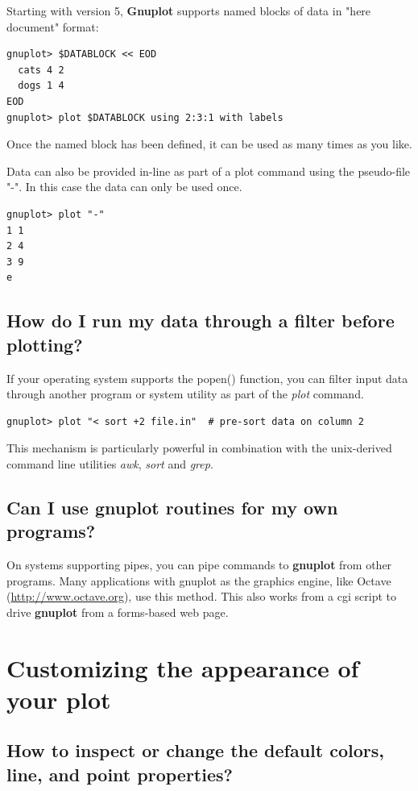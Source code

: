 \documentclass[letter,11pt]{article}
\def\http#1{{\small\href{http://#1}{\url{http://#1}}}}
\newcommand{\http}[1]%
            {\htmladdnormallink{\latex{\url{http://#1}}%
                    \html{\textit{http://#1}}}%
                {http://#1}%
            }
\newcommand{\gnuplot}{\textbf{gnuplot }}
\newcommand{\Gnuplot}{\textbf{Gnuplot }}
\begin{document}
{Starting with version 5, \Gnuplot supports named blocks of data in "here document" format:
\small
\begin{verbatim}
gnuplot> $DATABLOCK << EOD
  cats 4 2
  dogs 1 4
EOD
gnuplot> plot $DATABLOCK using 2:3:1 with labels
\end{verbatim}
\normalsize
Once the named block has been defined, it can be used as many times
as you like.

Data can also be provided in-line as part of a plot command using the
pseudo-file "-".  In this case the data can only be used once.

\small
\begin{verbatim}
gnuplot> plot "-"
1 1
2 4
3 9
e
\end{verbatim}
\normalsize

\subsection{How do I run my data through a filter before plotting?}

If your operating system supports the popen() function, you
can filter input data through another program or system utility
as part of the {\em plot} command.

\small
\begin{verbatim}
gnuplot> plot "< sort +2 file.in"  # pre-sort data on column 2
\end{verbatim}
\normalsize

This mechanism is particularly powerful in combination with the
unix-derived command line utilities {\em awk}, {\em sort} and {\em grep}.

\subsection{Can I use \gnuplot routines for my own programs?}

On systems supporting pipes, you can pipe commands to \gnuplot from other
programs. Many applications with gnuplot as the graphics engine, like Octave
(\http{www.octave.org}), use this method. This also works from a cgi script to
drive \gnuplot from a forms-based web page.


\section{Customizing the appearance of your plot}

\subsection{How to inspect or change the default colors, line, and point properties?}

}
\end{document}
